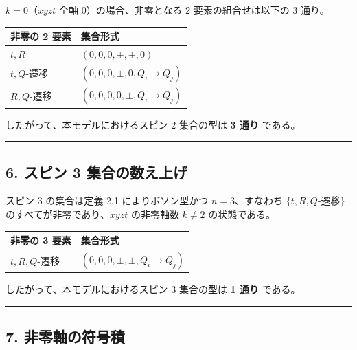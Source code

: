 \documentclass[
  a4paper,11pt]{ltjsarticle}
\newcounter{none}
\theoremstyle{definition}
\theoremstyle{remark}
\begin{document}
\(k = 0\)（\(xyzt\) 全軸 \(0\)）の場合、非零となる 2
要素の組合せは以下の 3 通り。

{\def\LTcaptype{none} %
\begin{longtable}[]{@{}ll@{}}
\toprule\noalign{}
非零の 2 要素 & 集合形式 \\
\midrule\noalign{}
\endhead
\bottomrule\noalign{}
\endlastfoot
\(t, R\) & \((0, 0, 0, \pm, \pm, 0)\) \\
\(t, Q\)-遷移 & \((0, 0, 0, \pm, 0, Q_i \to Q_j)\) \\
\(R, Q\)-遷移 & \((0, 0, 0, 0, \pm, Q_i \to Q_j)\) \\
\end{longtable}
}

したがって、本モデルにおけるスピン 2 集合の型は \textbf{3 通り} である。

\begin{center}\rule{0.5\linewidth}{0.5pt}\end{center}

\subsection{6. スピン 3
集合の数え上げ}\label{ux30b9ux30d4ux30f3-3-ux96c6ux5408ux306eux6570ux3048ux4e0aux3052}

スピン 3 の集合は定義 2.1 によりボソン型かつ \(n = 3\)、すなわち
\(\{t, R, Q\text{-遷移}\}\) のすべてが非零であり、\(xyzt\) の非零軸数
\(k \neq 2\) の状態である。

{\def\LTcaptype{none} %
\begin{longtable}[]{@{}ll@{}}
\toprule\noalign{}
非零の 3 要素 & 集合形式 \\
\midrule\noalign{}
\endhead
\bottomrule\noalign{}
\endlastfoot
\(t, R, Q\)-遷移 & \((0, 0, 0, \pm, \pm, Q_i \to Q_j)\) \\
\end{longtable}
}

したがって、本モデルにおけるスピン 3 集合の型は \textbf{1 通り} である。

\begin{center}\rule{0.5\linewidth}{0.5pt}\end{center}

\subsection{7.
非零軸の符号積}\label{ux975eux96f6ux8ef8ux306eux7b26ux53f7ux7a4d}
\end{document}

